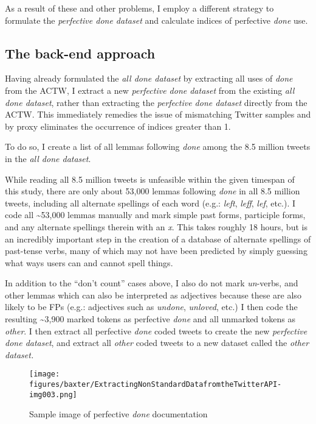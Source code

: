 \documentclass[output=paper,draftmode,colorlinks,citecolor=brown]{langscibook}
\begin{document}
As a result of these and other problems, I employ a different strategy to formulate the \textit{perfective done dataset} and calculate indices of perfective \textit{done} use.

\subsection{The back-end approach}
\label{sec:baxter:4.2}
Having already formulated the \textit{all done dataset} by extracting all uses of \textit{done} from the ACTW, I extract a new \textit{perfective done dataset} from the existing \textit{all done dataset}, rather than extracting the \textit{perfective done dataset} directly from the ACTW. This immediately remedies the issue of mismatching Twitter samples and by proxy eliminates the occurrence of indices greater than 1.

To do so, I create a list of all lemmas following \textit{done} among the 8.5 million tweets in the \textit{all done dataset}.

While reading all 8.5 million tweets is unfeasible within the given timespan of this study, there are only about 53,000 lemmas following \textit{done} in all 8.5 million tweets, including all alternate spellings of each word (e.g.: \textit{left}, \textit{leff}, \textit{lef}, etc.). I code all {\textasciitilde}53,000 lemmas manually and mark simple past forms, participle forms, and any alternate spellings therein with an \textit{x}. This takes roughly 18 hours, but is an incredibly important step in the creation of a database of alternate spellings of past-tense verbs, many of which may not have been predicted by simply guessing what ways users can and cannot spell things.

In addition to the “don’t count” \citep{Blake1997} cases above, I also do not mark \textit{un}{}-verbs, and other lemmas which can also be interpreted as adjectives because these are also likely to be FPs (e.g.: adjectives such as \textit{undone}, \textit{unloved}, etc.) I then code the resulting {\textasciitilde}3,900 marked tokens as perfective \textit{done} and all unmarked tokens as \textit{other}. I then extract all perfective \textit{done} coded tweets to create the new \textit{perfective done dataset}, and extract all \textit{other} coded tweets to a new dataset called the \textit{other dataset.}

 
\begin{figure}
\texttt{[image: figures/baxter/ExtractingNonStandardDatafromtheTwitterAPI-img003.png]}
\caption{Sample image of perfective \textit{done} documentation}
\label{fig:baxter:3}
\end{figure}
\end{document}
